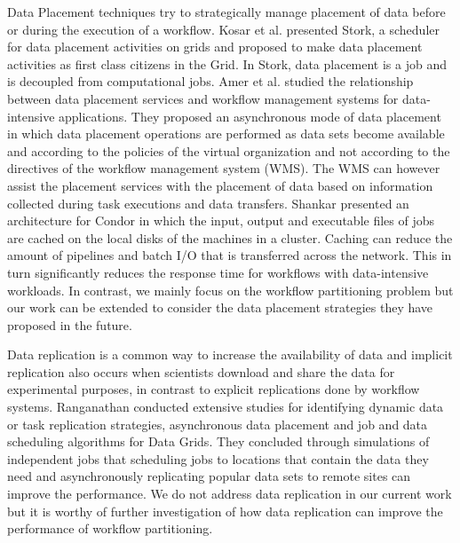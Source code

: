 Data Placement techniques try to strategically manage placement of data before or during the execution of a workflow. Kosar et al. \cite{Kosar2004} presented Stork, a scheduler for data placement activities on grids and proposed to make data placement activities as first class citizens in the Grid. In Stork, data placement is a job and is decoupled from computational jobs. Amer et al. \cite{Amer2012} studied the relationship between data placement services and workflow management systems for data-intensive applications. They proposed an asynchronous mode of data placement in which data placement operations are performed as data sets become available and according to the policies of the virtual organization and not according to the directives of the workflow management system (WMS). The WMS can however assist the placement services with the placement of data based on information collected during task executions and data transfers. Shankar \cite{Shankar2007} presented an architecture for Condor in which the input, output and executable files of jobs are cached on the local disks of the machines in a cluster. Caching can reduce the amount of pipelines and batch I/O that is transferred across the network. This in turn significantly reduces the response time for workflows with data-intensive workloads. In contrast, we mainly focus on the workflow partitioning problem but our work can be extended to consider the data placement strategies they have proposed in the future. 


Data replication is a common way to increase the availability of data and implicit replication also occurs when scientists download and share the data for experimental purposes, in contrast to explicit replications done by workflow systems. Ranganathan  \cite{Ranganathan2001} conducted extensive studies for identifying dynamic data or task replication strategies, asynchronous data placement and job and data scheduling algorithms for Data Grids. They concluded through simulations of independent jobs that scheduling jobs to locations that contain the data they need and asynchronously replicating popular data sets to remote sites can improve the performance. We do not address data replication in our current work but it is worthy of further investigation of how data replication can improve the performance of workflow partitioning. 

